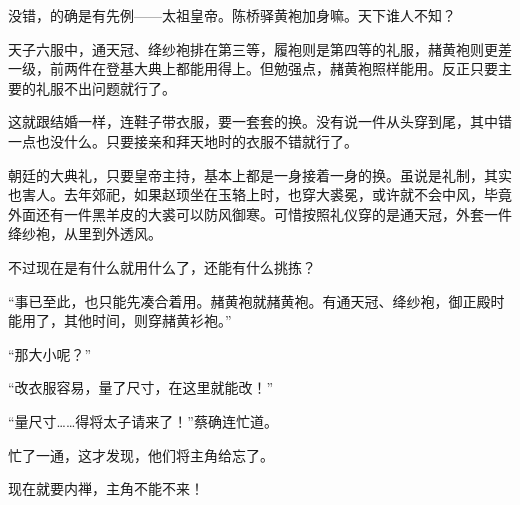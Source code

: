 没错，的确是有先例——太祖皇帝。陈桥驿黄袍加身嘛。天下谁人不知？

天子六服中，通天冠、绛纱袍排在第三等，履袍则是第四等的礼服，赭黄袍则更差一级，前两件在登基大典上都能用得上。但勉强点，赭黄袍照样能用。反正只要主要的礼服不出问题就行了。

这就跟结婚一样，连鞋子带衣服，要一套套的换。没有说一件从头穿到尾，其中错一点也没什么。只要接亲和拜天地时的衣服不错就行了。

朝廷的大典礼，只要皇帝主持，基本上都是一身接着一身的换。虽说是礼制，其实也害人。去年郊祀，如果赵顼坐在玉辂上时，也穿大裘冕，或许就不会中风，毕竟外面还有一件黑羊皮的大裘可以防风御寒。可惜按照礼仪穿的是通天冠，外套一件绛纱袍，从里到外透风。

不过现在是有什么就用什么了，还能有什么挑拣？

“事已至此，也只能先凑合着用。赭黄袍就赭黄袍。有通天冠、绛纱袍，御正殿时能用了，其他时间，则穿赭黄衫袍。”

“那大小呢？”

“改衣服容易，量了尺寸，在这里就能改！”

“量尺寸……得将太子请来了！”蔡确连忙道。

忙了一通，这才发现，他们将主角给忘了。

现在就要内禅，主角不能不来！


